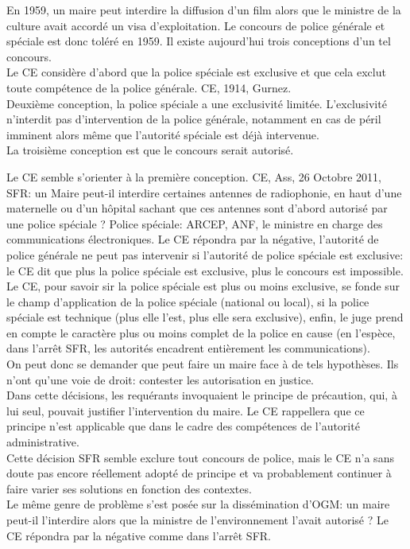 \documentclass[10pt, a4paper, openany]{book}
\begin{document}
En 1959, un maire peut interdire la diffusion d'un film alors que le ministre de la culture avait accordé un visa d'exploitation. Le concours de police générale et spéciale est donc toléré en 1959. Il existe aujourd'hui trois conceptions d'un tel concours. \\
Le CE considère d'abord que la police spéciale est exclusive et que cela exclut toute compétence de la police générale. CE, 1914, Gurnez. \\
Deuxième conception, la police spéciale a une exclusivité limitée. L'exclusivité n'interdit pas d'intervention de la police générale, notamment en cas de péril imminent alors même que l'autorité spéciale est déjà intervenue. \\
La troisième conception est que le concours serait autorisé.


Le CE semble s'orienter à la première conception. CE, Ass, 26 Octobre 2011, SFR: un Maire peut-il interdire certaines antennes de radiophonie, en haut d'une maternelle ou d'un hôpital sachant que ces antennes sont d'abord autorisé par une police spéciale ? Police spéciale: ARCEP, ANF, le ministre en charge des communications électroniques. Le CE répondra par la négative, l'autorité de police générale ne peut pas intervenir si l'autorité de police spéciale est exclusive: le CE dit que plus la police spéciale est exclusive, plus le concours est impossible. Le CE, pour savoir sir la police spéciale est plus ou moins exclusive, se fonde sur le champ d'application de la police spéciale (national ou local), si la police spéciale est technique (plus elle l'est, plus elle sera exclusive), enfin, le juge prend en compte le caractère plus ou moins complet de la police en cause (en l'espèce, dans l'arrêt SFR, les autorités encadrent entièrement les communications). \\
On peut donc se demander que peut faire un maire face à de tels hypothèses. Ils n'ont qu'une voie de droit: contester les autorisation en justice. \\
Dans cette décisions, les requérants invoquaient le principe de précaution, qui, à lui seul, pouvait justifier l'intervention du maire. Le CE rappellera que ce principe n'est applicable que dans le cadre des compétences de l'autorité administrative. \\
Cette décision SFR semble exclure tout concours de police, mais le CE n'a sans doute pas encore réellement adopté de principe et va probablement continuer à faire varier ses solutions en fonction des contextes. \\
Le même genre de problème s'est posée sur la dissémination d'OGM: un maire peut-il l'interdire alors que la ministre de l'environnement l'avait autorisé ? Le CE répondra par la négative comme dans l'arrêt SFR. 
\end{document}
